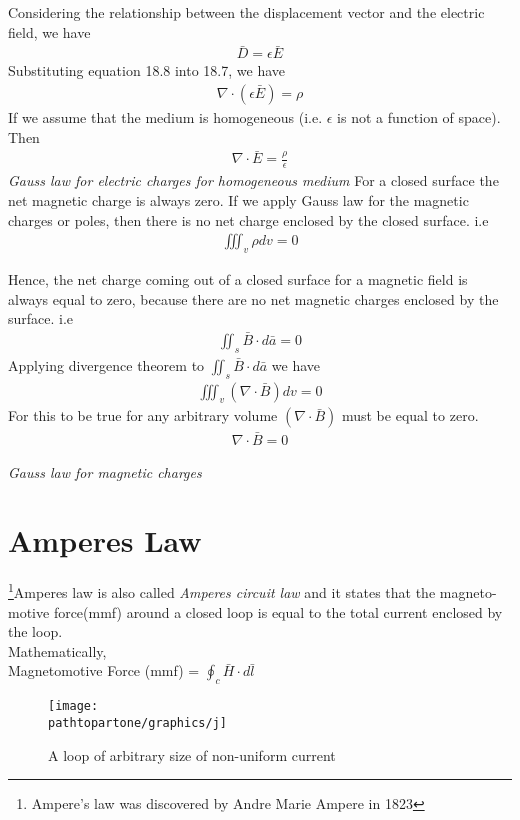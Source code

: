 Considering the relationship between the displacement vector and the electric field, we have 
\begin{align}
\boxed{\bar{D} = \epsilon\bar{E}}
\end{align}
Substituting equation 18.8 into 18.7, we have
\begin{align*}
\nabla \cdot (\epsilon\bar{E}) = \rho
\end{align*}
If we assume that the medium is homogeneous (i.e. $\epsilon$ is not a function of space). Then
\begin{align} 
\boxed{\nabla \cdot \bar{E} = \frac{\rho}{\epsilon}}
\end{align} 
\emph{Gauss law for electric charges for homogeneous medium}
For a closed surface the net magnetic charge is always zero. If we apply Gauss law for the magnetic charges or poles, then there is no net charge enclosed by the closed surface. i.e
\begin{align*}
\iiint_v\rho dv = 0
\end{align*}

Hence, the net charge coming out of a closed surface for a magnetic field is always equal to zero, because there are no net magnetic charges enclosed by the surface. i.e 
\begin{align*}
\iint_s\bar{B}\cdot d\bar{a} = 0
\end{align*}
Applying divergence theorem to $\iint_s\bar{B}\cdot d\bar{a}$ we have
\begin{align*}
\iiint_v(\nabla \cdot \bar{B})dv = 0
\end{align*}	
For this to be true for any arbitrary volume $(\nabla \cdot \bar{B})$ must be equal to zero.
\begin{align}
\boxed{\nabla \cdot \bar{B} = 0}
\end{align}
\begin{center}
\emph{Gauss law for magnetic charges}
\end{center}

\section{Amperes Law}
\footnote[7]{Ampere's law was discovered by Andre Marie Ampere in 1823 }Amperes law is also called \emph{Amperes circuit law} and it states that the magneto-motive force(mmf) around a closed loop is equal to the total current enclosed by the loop.\\
Mathematically, \\
Magnetomotive Force (mmf) = $\oint_c \bar{H} \cdot d\bar{l}$ 
\begin{figure}[h]
\centering
\texttt{[image: \\pathtopartone/graphics/j]}
\caption{A loop of arbitrary size of non-uniform current}
\label{fig:j}
\end{figure}

